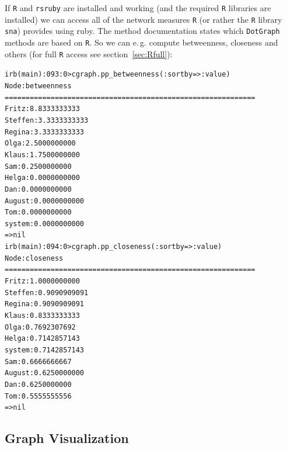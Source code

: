 \documentclass[a4paper]{scrartcl}
\newcounter{tcounter}
\newcommand{\tcount}{\makebox[0pt][r]{\tiny\thetcounter~}}
\newenvironment{typed}{\refstepcounter{tcounter}\bgroup\setlength{\topsep}{0pt}\renewcommand{\FrameCommand}[1]{\fcolorbox{black!30}{bgcolor}{##1}\tcount}\MakeFramed{\FrameRestore}\begin{alltt}\small}{\end{alltt}\endMakeFramed\egroup\par\aftergroup\noindent\aftergroup\ignorespaces}
\newcommand{\file}[1]{\texttt{\color{file}#1}}
\newcommand{\code}[1]{\texttt{\color{code}#1}}
\newcommand{\p}{\textcolor{prompt}}
\renewcommand{\c}{\textcolor{cmd}}
\begin{document}
If \file{R} and \file{rsruby} are installed and working (and the
required \file{R} libraries are installed) we can access all of the
network measures \file{R} (or rather the \file{R} library \file{sna})
provides using ruby. The method documentation states which
\code{DotGraph} methods are based on \file{R}. So we can
e.\,g. compute betweenness, closeness and others (for full
\file{R} access see section~\ref{sec:Rfull}):%
\begin{typed}
\p{irb(main):093:0>} \c{cgraph.pp_betweenness(:sortby => :value)}
Node                          :          betweenness
============================================================
Fritz                         :         8.8333333333
Steffen                       :         3.3333333333
Regina                        :         3.3333333333
Olga                          :         2.5000000000
Klaus                         :         1.7500000000
Sam                           :         0.2500000000
Helga                         :         0.0000000000
Dan                           :         0.0000000000
August                        :         0.0000000000
Tom                           :         0.0000000000
system                        :         0.0000000000
=> nil
\p{irb(main):094:0>} \c{cgraph.pp_closeness(:sortby => :value)}
Node                          :            closeness
============================================================
Fritz                         :         1.0000000000
Steffen                       :         0.9090909091
Regina                        :         0.9090909091
Klaus                         :         0.8333333333
Olga                          :         0.7692307692
Helga                         :         0.7142857143
system                        :         0.7142857143
Sam                           :         0.6666666667
August                        :         0.6250000000
Dan                           :         0.6250000000
Tom                           :         0.5555555556
=> nil
\end{typed}

\subsection{Graph Visualization}
\label{sec:gvis}
\end{document}
